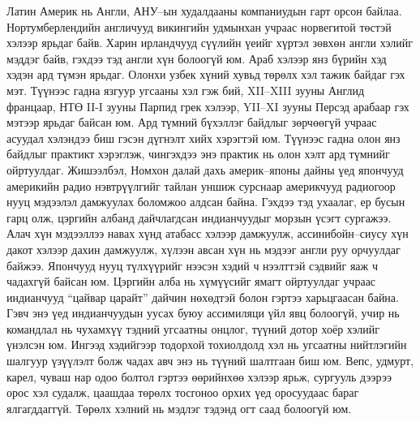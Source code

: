 Латин Америк нь Англи, АНУ–ын худалдааны компаниудын гарт орсон байлаа. Нортумберлендийн англичууд викингийн удмынхан учраас норвегитой төстэй хэлээр ярьдаг байв. Харин ирландчууд сүүлийн үеийг хүртэл зөвхөн англи хэлийг мэддэг байв, гэхдээ тэд англи хүн болоогүй юм. Араб хэлээр янз бүрийн хэд хэдэн ард түмэн ярьдаг. Олонхи узбек хүний хувьд төрөлх хэл тажик байдаг гэх мэт. Түүнээс гадна язгуур угсааны хэл гэж бий, XII–XIII зууны Англид францаар, НТӨ II-I зууны Парпид грек хэлээр, YII–XI зууны Персэд арабаар гэх мэтээр ярьдаг байсан юм. Ард түмний бүхэллэг байдлыг зөрчөөгүй учраас асуудал хэлэндээ биш гэсэн дүгнэлт хийх хэрэгтэй юм.
Түүнээс гадна олон янз байдлыг практикт хэрэглэж, чингэхдээ энэ практик нь олон хэлт ард түмнийг ойртуулдаг. Жишээлбэл, Номхон далай дахь америк–японы дайны үед япончууд америкийн радио нэвтрүүлгийг тайлан уншиж сурснаар америкчууд радиогоор нууц мэдээлэл дамжуулах боломжоо алдсан байна. Гэхдээ тэд ухаалаг, ер бусын гарц олж, цэргийн албанд дайчлагдсан индианчуудыг морзын үсэгт сургажээ. Алач хүн мэдээллээ навах хүнд атабасс хэлээр дамжуулж, ассинибойн–сиусу хүн дакот хэлээр дахин дамжуулж, хүлээн авсан хүн нь мэдээг англи руу орчуулдаг байжээ. Япончууд нууц түлхүүрийг нээсэн хэдий ч нээлттэй сэдвийг яаж ч чадахгүй байсан юм. Цэргийн алба нь хүмүүсийг ямагт ойртуулдаг учраас индианчууд “цайвар царайт” дайчин нөхөдтэй болон гэртээ харьцгаасан байна. Гэвч энэ үед индианчуудын уусах буюу ассимиляци үйл явц болоогүй, учир нь командлал нь чухамхүү тэдний угсаатны онцлог, түүний дотор хоёр хэлийг үнэлсэн юм. Ингээд хэдийгээр тодорхой тохиолдолд хэл нь угсаатны нийтлэгийн шалгуур үзүүлэлт болж чадах авч энэ нь түүний шалтгаан биш юм.
Вепс, удмурт, карел, чуваш нар одоо болтол гэртээ өөрийнхөө хэлээр ярьж, сургууль дээрээ орос хэл судалж, цаашдаа төрөлх тосгоноо орхих үед оросуудаас бараг ялгагддаггүй. Төрөлх хэлний нь мэдлэг тэдэнд огт саад болоогүй юм.

